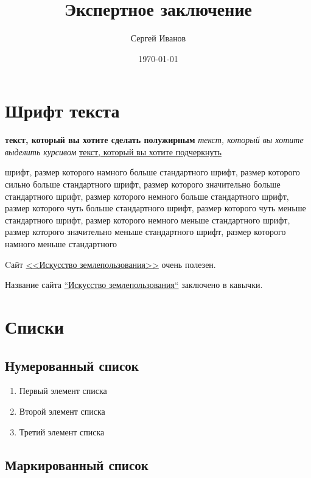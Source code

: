\documentclass[a4paper,12pt]{article}
\title{Экспертное заключение}
\author{Сергей Иванов}
\date{\today}
\begin{document}
\pagestyle{fancy}%

\maketitle

\tableofcontents


\section{Шрифт текста} 

\textbf{текст, который вы хотите сделать полужирным}
\textit{текст, который вы хотите выделить курсивом}
\underline{текст, который вы хотите подчеркнуть}

{\Huge шрифт, размер которого намного больше стандартного}
{\huge шрифт, размер которого сильно больше стандартного}
{\LARGE шрифт, размер которого значительно больше стандартного}
{\Large шрифт, размер которого немного больше стандартного}
{\large шрифт, размер которого чуть больше стандартного}
{\small шрифт, размер которого чуть меньше стандартного}
{\footnotesize шрифт, размер которого немного меньше стандартного}
{\scriptsize шрифт, размер которого значительно меньше стандартного}
{\tiny шрифт, размер которого намного меньше стандартного}

Cайт \href{https://kadinfo.ru}{<<Искусство землепользования>>} очень полезен.

Название сайта \href{https://kadinfo.ru}{``Искусство землепользования``} заключено в кавычки.

\section{Списки} 

\subsection*{Нумерованный список} 

\begin{enumerate}
    \item Первый элемент списка
    \item Второй элемент списка
    \item Третий элемент списка
\end{enumerate}


\subsection*{Маркированный список}
\end{document}

